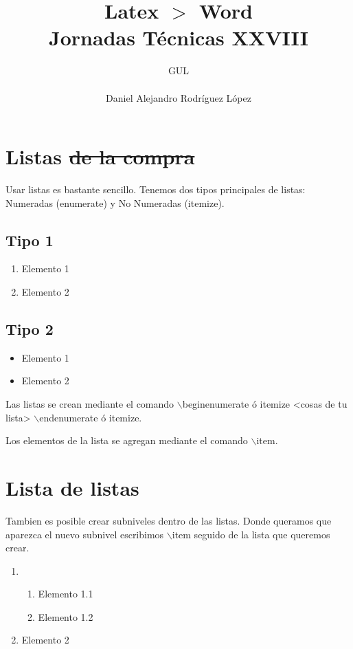 \documentclass[10pt,a4paper,titlepage]{article} %
\title{ \textbf{ \Huge{Latex $>$ Word}} \\ Jornadas Técnicas XXVIII}
\author{
		\begin{tabular}{l}
			\multicolumn{1}{l}{GUL} \\ \hline \\
			Daniel Alejandro Rodríguez López \\
		\end{tabular}
}
\begin{document}
\maketitle

\newpage

\section*{Listas \sout{de la compra}}
	Usar listas es bastante sencillo. Tenemos dos tipos principales de listas: Numeradas (enumerate) y No Numeradas (itemize).

	\subsection*{Tipo 1}
		\begin{enumerate}
			\item Elemento 1
			\item Elemento 2
		\end{enumerate}

	\subsection*{Tipo 2}
		\begin{itemize}
			\item Elemento 1
			\item Elemento 2
		\end{itemize}

	Las listas se crean mediante el comando $\backslash$begin{enumerate ó itemize} <cosas de tu lista> $\backslash$end{enumerate ó itemize}.

	Los elementos de la lista se agregan mediante el comando $\backslash$item.

\section*{Lista de listas}
	Tambien es posible crear subniveles dentro de las listas. Donde queramos que aparezca el nuevo subnivel escribimos $\backslash$item seguido de la lista que queremos crear.
	\begin{enumerate}
		\item \begin{enumerate}
			\item Elemento 1.1
			\item Elemento 1.2
		\end{enumerate}
		\item Elemento 2
	\end{enumerate}
\end{document}
